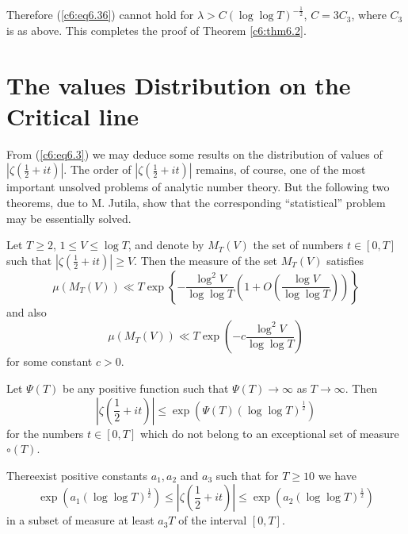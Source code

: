 Therefore (\ref{c6:eq6.36}) cannot hold for $\lambda > C (\log \log
T)^{-\frac{1}{2}}$, $C = 3 C_3$, where $C_3$ is as above. This
completes the proof of Theorem \ref{c6:thm6.2}. 

\section{The values Distribution on the Critical line}\label{c6:sec6.3}

From (\ref{c6:eq6.3}) we may deduce some results on the distribution
of values of $|\zeta(\frac{1}{2} + it)|$. The order of
$|\zeta(\frac{1}{2} + it)|$ remains, of course, one of the most
important unsolved problems of analytic number theory. But the
following two theorems, due to M. Jutila, show that the corresponding
``statistical'' problem may be essentially solved. 

\begin{thm}\label{c6:thm6.3}
Let $T \geq 2$, $1 \leq V \leq \log T$, and denote by $M_T(V)$ the set
of numbers $t \in [0,T]$ such that $|\zeta(\frac{1}{2} + it)| \geq
V$. Then the measure of the set $M_T(V)$ satisfies 
\begin{equation}
\mu(M_T (V)) \ll T \exp \left\{ -\frac{\log^2 V}{\log \log T} \left(1
+ O \left( \frac{\log V}{\log \log T}\right) \right)\right\}
\label{c6:eq6.43} 
\end{equation}
and also
\begin{equation}
\mu (M_T (V)) \ll T \exp \left(-c\frac{\log^2 V}{\log \log T} \right)
\label{c6:eq6.44} 
\end{equation}
for some constant $c >0$.
 \end{thm}

\begin{coro*}
Let $\Psi (T)$ be any positive function such that $\Psi (T) \to
\infty$ as $T \to \infty$. Then 
$$
\left|\zeta \left(\frac{1}{2} + it \right)\right| \leq \exp 
\left(\Psi (T) (\log \log T)^{\frac{1}{2}}\right) 
$$
for the numbers $t \in [0,T]$ which do not belong to an exceptional
set of measure $\circ(T)$. 
\end{coro*}

\begin{thm}\label{c6:thm6.4}
There\pageoriginale exist positive constants $a_1, a_2$ and $a_3$ such
that for $T \geq 10$ we have 
$$
\exp \left(a_1 (\log \log T)^{\frac{1}{2}}\right) \leq \left|\zeta
\left(\frac{1}{2} + it \right)\right| \leq \exp \left(a_2 (\log \log
T)^{\frac{1}{2}}\right) 
$$
in a subset of measure at least $a_3T$ of the interval $[0,T]$.
\end{thm}

